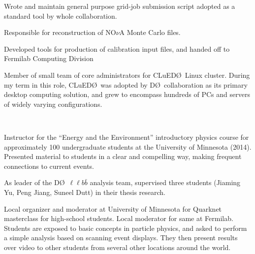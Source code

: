 \documentclass[amsmath,amssymb]{revtex4}
\def\dzero{D\O}
\def\cluedo{CLuED\O}
\begin{document}
\begin{list}{}
            {\setlength{\itemsep}{0.0in}\setlength{\parsep}{0.0in}
             \addtolength{\parskip}{-0.5in}}
\item Wrote and maintain general purpose grid-job submission script adopted
  as a standard tool by whole collaboration.
\item Responsible for reconstruction of NO$\nu$A Monte Carlo files.
\item Developed tools for production of calibration input files, and
  handed off to Fermilab Computing Division
\item Member of small team of core administrators for \cluedo\ Linux
  cluster.  During my term in this role, \cluedo~was adopted by
  \dzero~collaboration as its primary desktop computing solution, and
  grew to encompass hundreds of PCs and servers of widely varying
  configurations.
\end{list}

\\

\begin{list}{}
            {\setlength{\itemsep}{0.0in}\setlength{\parsep}{0.0in}
             \addtolength{\parskip}{-0.5in}}
\item Instructor for the ``Energy and the Environment'' introductory
  physics course for approximately 100 undergraduate students at the
  University of Minnesota (2014).  Presented material to students in a
  clear and compelling way, making frequent connections to current
  events.
\item As leader of the \dzero~$\ell\ell b{\bar b}$ analysis team,
  supervised three students (Jiaming Yu, Peng Jiang, Suneel Dutt) in
  their thesis research.
\item Local organizer and moderator at University of Minnesota for
  Quarknet masterclass for high-school students.  Local moderator for
  same at Fermilab.  Students are exposed to basic concepts in
  particle physics, and asked to perform a simple analysis based on
  scanning event displays.  They then present results over video to
  other students from several other locations around the world.
%
%
\end{list}
\end{document}
